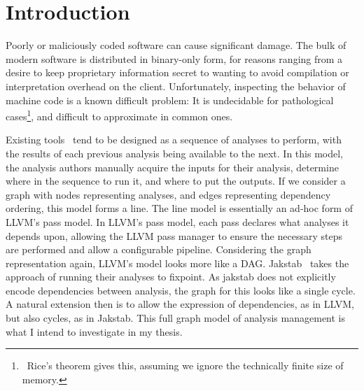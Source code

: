 \chapter{Introduction}
%
%
Poorly or maliciously coded software can cause significant damage.
The bulk of modern software is distributed in binary-only form, for reasons ranging from a desire to keep proprietary information secret to wanting to avoid compilation or interpretation overhead on the client.
Unfortunately, inspecting the behavior of machine code is a known difficult problem:
It is undecidable for pathological cases\footnote{\
        Rice's theorem gives this, assuming we ignore the technically finite size of memory.
}, and difficult to approximate in common ones.

Existing tools~\cite{ida, bap, bitblaze, bindead} tend to be designed as a sequence of analyses to perform, with the results of each previous analysis being available to the next.
In this model, the analysis authors manually acquire the inputs for their analysis, determine where in the sequence to run it, and where to put the outputs.
If we consider a graph with nodes representing analyses, and edges representing dependency ordering, this model forms a line.
The line model is essentially an ad-hoc form of LLVM\cite{llvm}'s pass model.
In LLVM's pass model, each pass declares what analyses it depends upon, allowing the LLVM pass manager to ensure the necessary steps are performed and allow a configurable pipeline.
Considering the graph representation again, LLVM's model looks more like a DAG.
Jakstab~\cite{jakstab} takes the approach of running their analyses to fixpoint.
As jakstab does not explicitly encode dependencies between analysis, the graph for this looks like a single cycle.
A natural extension then is to allow the expression of dependencies, as in LLVM, but also cycles, as in Jakstab.
This full graph model of analysis management is what I intend to investigate in my thesis.

